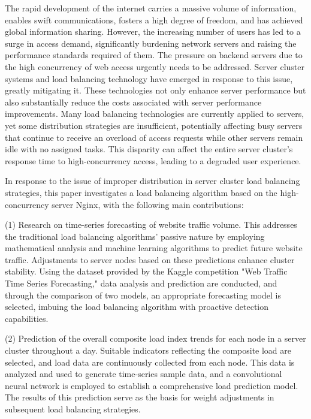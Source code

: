 
\begin{eabstract} 
The rapid development of the internet carries a massive volume of information, enables swift communications, fosters a high degree of freedom, and has achieved global information sharing. However, the increasing number of users has led to a surge in access demand, significantly burdening network servers and raising the performance standards required of them. The pressure on backend servers due to the high concurrency of web access urgently needs to be addressed. Server cluster systems and load balancing technology have emerged in response to this issue, greatly mitigating it. These technologies not only enhance server performance but also substantially reduce the costs associated with server performance improvements. Many load balancing technologies are currently applied to servers, yet some distribution strategies are insufficient, potentially affecting busy servers that continue to receive an overload of access requests while other servers remain idle with no assigned tasks. This disparity can affect the entire server cluster's response time to high-concurrency access, leading to a degraded user experience.

In response to the issue of improper distribution in server cluster load balancing strategies, this paper investigates a load balancing algorithm based on the high-concurrency server Nginx, with the following main contributions:

(1) Research on time-series forecasting of website traffic volume. This addresses the traditional load balancing algorithms' passive nature by employing mathematical analysis and machine learning algorithms to predict future website traffic. Adjustments to server nodes based on these predictions enhance cluster stability. Using the dataset provided by the Kaggle competition "Web Traffic Time Series Forecasting," data analysis and prediction are conducted, and through the comparison of two models, an appropriate forecasting model is selected, imbuing the load balancing algorithm with proactive detection capabilities.

(2) Prediction of the overall composite load index trends for each node in a server cluster throughout a day. Suitable indicators reflecting the composite load are selected, and load data are continuously collected from each node. This data is analyzed and used to generate time-series sample data, and a convolutional neural network is employed to establish a comprehensive load prediction model. The results of this prediction serve as the basis for weight adjustments in subsequent load balancing strategies.


\end{eabstract}
